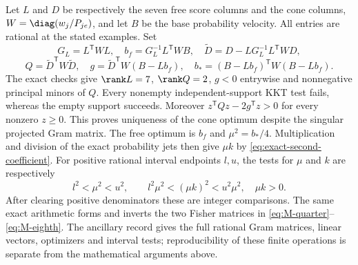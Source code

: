 Let $L$ and $D$ be respectively the seven free score columns and the cone
columns, $W=\diag(w_j/P_{je})$, and let $B$ be the base probability
velocity. All entries are rational at the stated examples. Set
\[
 G_L=L^{\mathsf T}WL,\quad
 b_f=G_L^{-1}L^{\mathsf T}WB,\quad
 \widetilde D=D-LG_L^{-1}L^{\mathsf T}WD,
\]
\[
 Q=\widetilde D^{\mathsf T}W\widetilde D,\quad
 g=\widetilde D^{\mathsf T}W(B-Lb_f),\quad
 b_*=(B-Lb_f)^{\mathsf T}W(B-Lb_f).
\]
The exact checks give $\rank L=7$, $\rank Q=2$, $g<0$ entrywise and
nonnegative principal minors of $Q$. Every nonempty independent-support
KKT test fails, whereas the empty support succeeds. Moreover
$z^{\mathsf T}Qz-2g^{\mathsf T}z>0$ for every nonzero $z\ge0$.
This proves uniqueness of the cone optimum despite the singular
projected Gram matrix. The free optimum is $b_f$ and $\mu^2=b_*/4$.
Multiplication and division of the exact probability jets then give
$\mu k$ by \eqref{eq:exact-second-coefficient}.
For positive rational interval endpoints $l,u$, the tests for $\mu$ and
$k$ are respectively
\[
 l^2<\mu^2<u^2,
 \qquad l^2\mu^2<(\mu k)^2<u^2\mu^2,
 \quad\mu k>0.
\]
After clearing positive denominators these are integer comparisons.
The same exact arithmetic forms and inverts the two Fisher matrices in
\eqref{eq:M-quarter}--\eqref{eq:M-eighth}. The ancillary record gives
the full rational Gram matrices, linear vectors, optimizers and interval
tests; reproducibility of these finite operations is separate from the
mathematical arguments above.
